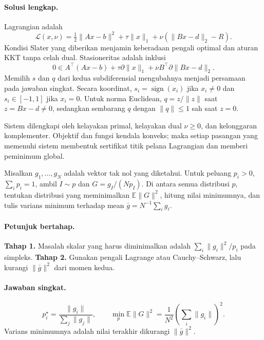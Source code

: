 \paragraph{Solusi lengkap.}
\label{orig03:final:solution:0003}
Lagrangian adalah
\[
 \mathcal L(x,\nu)=\tfrac12\lVert Ax-b\rVert^2
 +\tau\lVert x\rVert_1+\nu(\lVert Bx-d\rVert_2-R).
\]
Kondisi Slater yang diberikan menjamin keberadaan pengali optimal dan aturan
KKT tanpa celah dual. Stasioneritas adalah inklusi
\[
 0\in A^\top(Ax-b)+\tau\partial\lVert x\rVert_1
 +\nu B^\top\partial\lVert Bx-d\rVert_2.
\]
Memilih $s$ dan $q$ dari kedua subdiferensial mengubahnya menjadi persamaan
pada jawaban singkat. Secara koordinat,
$s_i=\operatorname{sign}(x_i)$ jika $x_i\ne0$ dan $s_i\in[-1,1]$ jika
$x_i=0$. Untuk norma Euclidean, $q=z/\lVert z\rVert$ saat $z=Bx-d\ne0$,
sedangkan sembarang $q$ dengan $\lVert q\rVert\le1$ sah saat $z=0$.

Sistem dilengkapi oleh kelayakan primal, kelayakan dual $\nu\ge0$, dan
kelonggaran komplementer. Objektif dan fungsi kendala konveks; maka setiap
pasangan yang memenuhi sistem membentuk sertifikat titik pelana Lagrangian
dan memberi peminimum global.

\begin{exercise}
\label{orig03:final:exercise:0004}
Misalkan $g_1,\ldots,g_N$ adalah vektor tak nol yang diketahui. Untuk peluang
$p_i>0$, $\sum_i p_i=1$, ambil $I\sim p$ dan
$G=g_I/(Np_I)$. Di antara semua distribusi $p$, tentukan distribusi yang
meminimalkan $\mathbb E\lVert G\rVert^2$, hitung nilai minimumnya, dan tulis
varians minimum terhadap mean $\bar g=N^{-1}\sum_i g_i$.
\end{exercise}

\paragraph{Petunjuk bertahap.}
\label{orig03:final:hint:0004}
\textbf{Tahap 1.} Masalah skalar yang harus diminimalkan adalah
$\sum_i\lVert g_i\rVert^2/p_i$ pada simpleks.
\textbf{Tahap 2.} Gunakan pengali Lagrange atau Cauchy--Schwarz, lalu kurangi
$\lVert\bar g\rVert^2$ dari momen kedua.

\paragraph{Jawaban singkat.}
\label{orig03:final:answer:0004}
\[
 p_i^\star=\frac{\lVert g_i\rVert}{\sum_j\lVert g_j\rVert},
 \qquad
 \min_p\mathbb E\lVert G\rVert^2
 =\frac1{N^2}\left(\sum_i\lVert g_i\rVert\right)^2.
\]
Varians minimumnya adalah nilai terakhir dikurangi $\lVert\bar g\rVert^2$.


